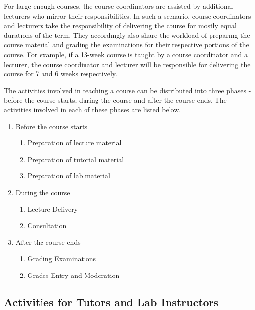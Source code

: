 For large enough courses, the course coordinators are assisted by additional lecturers who mirror their responsibilities. In such a scenario, course coordinators and lecturers take the responsibility of delivering the course for mostly equal durations of the term. They accordingly also share the workload of preparing the course material and grading the examinations for their respective portions of the course. For example, if a 13-week course is taught by a course coordinator and a lecturer, the course coordinator and lecturer will be responsible for delivering the course for 7 and 6 weeks respectively.

The activities involved in teaching a course can be distributed into three phases - before the course starts, during the course and after the course ends. The activities involved in each of these phases are listed below.

\begin{enumerate}
  \item Before the course starts
        \begin{enumerate}
          \item Preparation of lecture material
          \item Preparation of tutorial material
          \item Preparation of lab material
        \end{enumerate}

  \item During the course
        \begin{enumerate}
          \item Lecture Delivery
          \item Consultation
        \end{enumerate}

  \item After the course ends
        \begin{enumerate}
          \item Grading Examinations
          \item Grades Entry and Moderation
        \end{enumerate}
\end{enumerate}

\subsection{Activities for Tutors and Lab Instructors}

